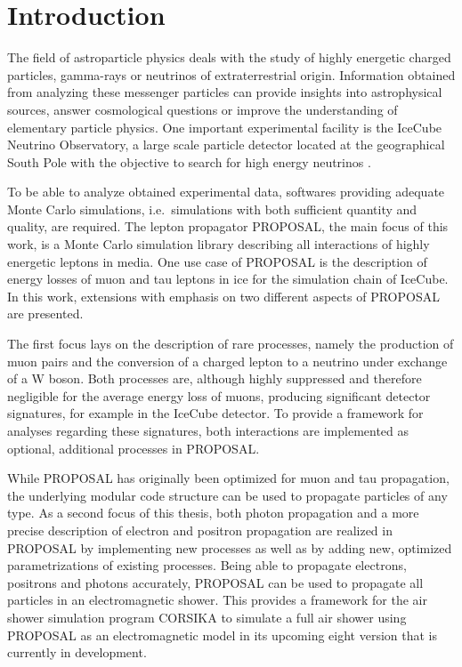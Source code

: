 \chapter{Introduction}

The field of astroparticle physics deals with the study of highly energetic charged particles, gamma-rays or neutrinos of extraterrestrial origin.
Information obtained from analyzing these messenger particles can provide insights into astrophysical sources, answer cosmological questions or improve the understanding of elementary particle physics.
One important experimental facility is the IceCube Neutrino Observatory, a large scale particle detector located at the geographical South Pole with the objective to search for high energy neutrinos \cite{Aartsen_2017}.

To be able to analyze obtained experimental data, softwares providing adequate Monte Carlo simulations, i.e.\ simulations with both sufficient quantity and quality, are required. 
The lepton propagator PROPOSAL, the main focus of this work, is a Monte Carlo simulation library describing all interactions of highly energetic leptons in media.
One use case of PROPOSAL is the description of energy losses of muon and tau leptons in ice for the simulation chain of IceCube.
In this work, extensions with emphasis on two different aspects of PROPOSAL are presented.

The first focus lays on the description of rare processes, namely the production of muon pairs and the conversion of a charged lepton to a neutrino under exchange of a W boson.
Both processes are, although highly suppressed and therefore negligible for the average energy loss of muons, producing significant detector signatures, for example in the IceCube detector.
To provide a framework for analyses regarding these signatures, both interactions are implemented as optional, additional processes in PROPOSAL.

While PROPOSAL has originally been optimized for muon and tau propagation, the underlying modular code structure can be used to propagate particles of any type.
As a second focus of this thesis, both photon propagation and a more precise description of electron and positron propagation are realized in PROPOSAL by implementing new processes as well as by adding new, optimized parametrizations of existing processes.
Being able to propagate electrons, positrons and photons accurately, PROPOSAL can be used to propagate all particles in an electromagnetic shower.
This provides a framework for the air shower simulation program CORSIKA to simulate a full air shower using PROPOSAL as an electromagnetic model in its upcoming eight version that is currently in development.

